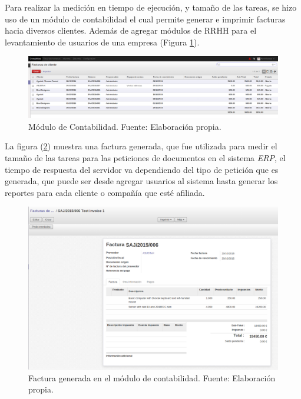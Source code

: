 \newpage
Para realizar la medición en tiempo de ejecución, y tamaño de las tareas, se hizo uso de un módulo de contabilidad el cual permite generar e imprimir facturas hacia diversos clientes. Además de agregar módulos de RRHH para el levantamiento de usuarios de una empresa (Figura \ref{fig:ContOdoo}).

\renewcommand\thefigure{\arabic{figure}}
\begin{figure}[h!]
	\centering
	\includegraphics[scale=0.2]{media/odoo/3}
	\caption{Módulo de Contabilidad. Fuente: Elaboración propia.}
	\label{fig:ContOdoo}
\end{figure}

La figura (\ref{fig:factOdoo}) muestra una factura generada, que fue utilizada para medir el tamaño de las tareas para las peticiones de documentos en el sistema \textit{ERP}, el tiempo de respuesta del servidor va dependiendo del tipo de petición que es generada, que puede ser desde agregar usuarios al sistema hasta generar los reportes para cada cliente o compañía que esté afiliada.

\newpage

\renewcommand\thefigure{\arabic{figure}}
\begin{figure}[h!]
	\centering
	\includegraphics[scale=0.2]{media/odoo/4}
	\caption{Factura generada en el módulo de contabilidad. Fuente: Elaboración propia.}
	\label{fig:factOdoo}
\end{figure}

